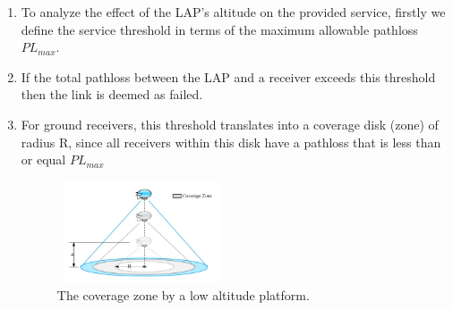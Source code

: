 \documentclass{beamer}
\begin{document}
\begin{frame}{}
\begin{enumerate}
    \item To analyze the effect of the LAP’s altitude on the provided service, firstly we define the service threshold in terms of the maximum allowable pathloss $PL_{max}$.
    \item If the total pathloss between the LAP and a receiver exceeds this threshold then the link is deemed as failed.
    \item For ground receivers, this threshold translates into a coverage disk (zone) of radius R, since all receivers within this disk have a pathloss that is less than or equal $PL_{max}$
     \begin{figure}
    \centering
    \includegraphics[width=5cm, height=3cm]{Figures/Figure3.png}
    \caption{The coverage zone by a low altitude platform.}
    \label{fig:3}
\end{figure}
    
\end{enumerate}
    
\end{frame}
\end{document}
